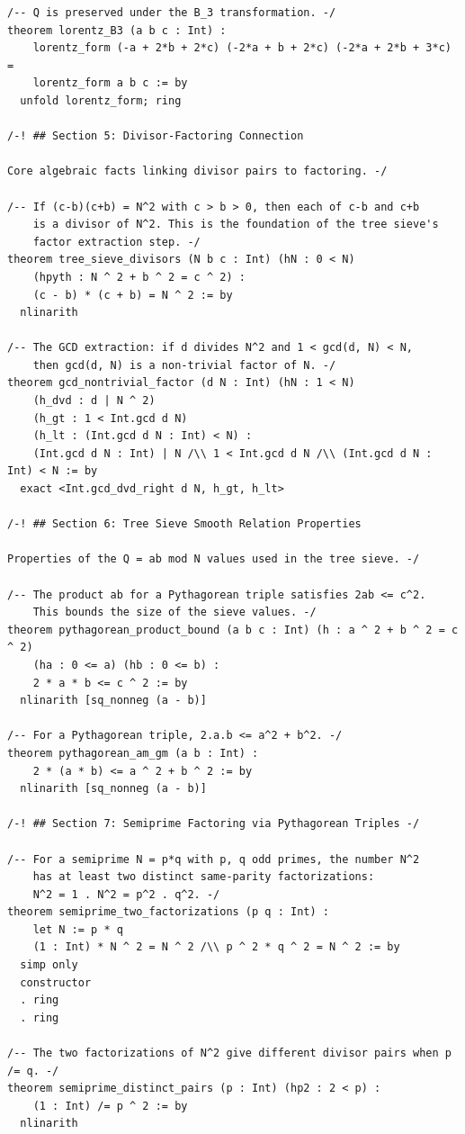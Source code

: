 \documentclass[11pt,openright,twoside]{book}
\theoremstyle{definition}
\begin{document}
\begin{lstlisting}[style=lean]
/-- Q is preserved under the B_3 transformation. -/
theorem lorentz_B3 (a b c : Int) :
    lorentz_form (-a + 2*b + 2*c) (-2*a + b + 2*c) (-2*a + 2*b + 3*c) =
    lorentz_form a b c := by
  unfold lorentz_form; ring

/-! ## Section 5: Divisor-Factoring Connection

Core algebraic facts linking divisor pairs to factoring. -/

/-- If (c-b)(c+b) = N^2 with c > b > 0, then each of c-b and c+b
    is a divisor of N^2. This is the foundation of the tree sieve's
    factor extraction step. -/
theorem tree_sieve_divisors (N b c : Int) (hN : 0 < N)
    (hpyth : N ^ 2 + b ^ 2 = c ^ 2) :
    (c - b) * (c + b) = N ^ 2 := by
  nlinarith

/-- The GCD extraction: if d divides N^2 and 1 < gcd(d, N) < N,
    then gcd(d, N) is a non-trivial factor of N. -/
theorem gcd_nontrivial_factor (d N : Int) (hN : 1 < N)
    (h_dvd : d | N ^ 2)
    (h_gt : 1 < Int.gcd d N)
    (h_lt : (Int.gcd d N : Int) < N) :
    (Int.gcd d N : Int) | N /\\ 1 < Int.gcd d N /\\ (Int.gcd d N : Int) < N := by
  exact <Int.gcd_dvd_right d N, h_gt, h_lt>

/-! ## Section 6: Tree Sieve Smooth Relation Properties

Properties of the Q = ab mod N values used in the tree sieve. -/

/-- The product ab for a Pythagorean triple satisfies 2ab <= c^2.
    This bounds the size of the sieve values. -/
theorem pythagorean_product_bound (a b c : Int) (h : a ^ 2 + b ^ 2 = c ^ 2)
    (ha : 0 <= a) (hb : 0 <= b) :
    2 * a * b <= c ^ 2 := by
  nlinarith [sq_nonneg (a - b)]

/-- For a Pythagorean triple, 2.a.b <= a^2 + b^2. -/
theorem pythagorean_am_gm (a b : Int) :
    2 * (a * b) <= a ^ 2 + b ^ 2 := by
  nlinarith [sq_nonneg (a - b)]

/-! ## Section 7: Semiprime Factoring via Pythagorean Triples -/

/-- For a semiprime N = p*q with p, q odd primes, the number N^2
    has at least two distinct same-parity factorizations:
    N^2 = 1 . N^2 = p^2 . q^2. -/
theorem semiprime_two_factorizations (p q : Int) :
    let N := p * q
    (1 : Int) * N ^ 2 = N ^ 2 /\\ p ^ 2 * q ^ 2 = N ^ 2 := by
  simp only
  constructor
  . ring
  . ring

/-- The two factorizations of N^2 give different divisor pairs when p /= q. -/
theorem semiprime_distinct_pairs (p : Int) (hp2 : 2 < p) :
    (1 : Int) /= p ^ 2 := by
  nlinarith


\end{lstlisting}
\end{document}

